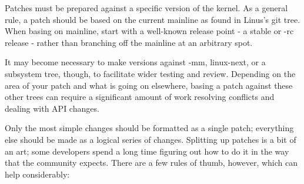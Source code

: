 \documentclass[a4paper,8pt,english]{sphinxmanual}
\begin{document}
Patches must be prepared against a specific version of the kernel.  As a
general rule, a patch should be based on the current mainline as found in
Linus's git tree.  When basing on mainline, start with a well-known release
point - a stable or -rc release - rather than branching off the mainline at
an arbitrary spot.

It may become necessary to make versions against -mm, linux-next, or a
subsystem tree, though, to facilitate wider testing and review.  Depending
on the area of your patch and what is going on elsewhere, basing a patch
against these other trees can require a significant amount of work
resolving conflicts and dealing with API changes.

Only the most simple changes should be formatted as a single patch;
everything else should be made as a logical series of changes.  Splitting
up patches is a bit of an art; some developers spend a long time figuring
out how to do it in the way that the community expects.  There are a few
rules of thumb, however, which can help considerably:
\end{document}
